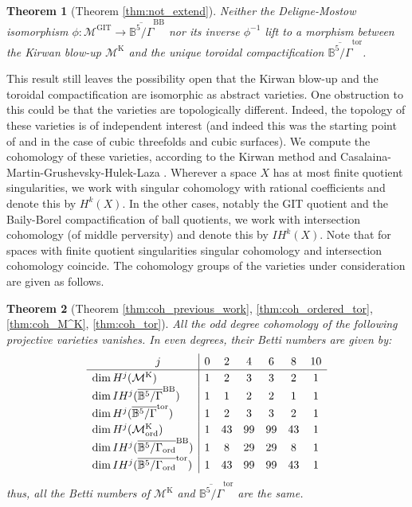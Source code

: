 \documentclass[12pt, pdftex]{amsart}
\theoremstyle{plain}
\newtheorem{thm}{Theorem}[section]
\theoremstyle{definition}
\numberwithin{equation}{section}
\def\B{{\mathbb B}}
\def\dim{\mathop{\mathrm{dim}}\nolimits}
\def\ord{\mathrm{ord}}
\def\GIT{\mathrm{GIT}}
\def\K{\mathrm{K}}
\def\tor{\mathrm{tor}}
\def\BB{\mathrm{BB}}
\def\M{\mathcal{M}}
\begin{document}
\begin{thm}[{Theorem \ref{thm:not_extend}}]
\label{mainthm:extendability}
Neither the Deligne-Mostow isomorphism $\phi:\M^{\GIT}\to\overline{\B^5/\Gamma}^{\BB}$ nor its inverse $\phi^{-1}$ lift to a morphism between the Kirwan blow-up $\M^{\K}$ and the unique toroidal compactification 
$\overline{\B^5/\Gamma}^{\tor}$.
\end{thm}



This result still leaves the possibility open that the Kirwan blow-up and the toroidal compactification are isomorphic as abstract varieties. 
One obstruction to this could be that the varieties are topologically different. Indeed, the topology of these varieties is of independent interest
(and indeed this was the starting point of \cite{CMGHL19} and  \cite{CMGHL22} in the case of cubic threefolds and cubic surfaces).
We compute the cohomology of these varieties, according to the Kirwan method \cite{Ki84, Ki85, Ki89} and Casalaina-Martin-Grushevsky-Hulek-Laza \cite{CMGHL19}.
Wherever a space $X$ has at most finite quotient singularities, we work with singular cohomology with rational coefficients and denote this by $H^k(X)$. In the other cases, notably the GIT quotient and 
the Baily-Borel compactification of ball quotients, we work with intersection cohomology (of middle perversity) and denote this by $IH^k(X)$. Note that for spaces with finite quotient singularities 
singular cohomology and intersection cohomology coincide.  
The cohomology groups of the varieties under consideration are given as follows.
\begin{thm}[{Theorem \ref{thm:coh_previous_work}, \ref{thm:coh_ordered_tor}, \ref{thm:coh_M^K}, \ref{thm:coh_tor}}]
All the odd degree cohomology of the following projective varieties vanishes.
In even degrees, their Betti numbers are given by:
\begin{align*}
\renewcommand*{\arraystretch}{1.2}
\begin{array}{l|cccccc}
\hskip2cm j&0&2&4&6&8&10\\\hline
\dim H^j(\M^{\K})&1&2&3&3&2&1\\
\dim IH^j(\overline{\B^5/\Gamma}^{\BB})&1&1&2&2&1&1\\
\dim H^j(\overline{\B^5/\Gamma}^{\tor})&1&2&3&3&2&1\\
\dim H^j(\M_{\ord}^{\K})&1&43&99&99&43&1\\
\dim IH^j(\overline{\B^5/\Gamma_{\ord}}^{\BB})&1&8&29&29&8&1\\
\dim IH^j(\overline{\B^5/\Gamma_{\ord}}^{\tor})&1&43&99&99&43&1
\end{array}
\end{align*}
thus, all the Betti numbers of $\M^{\K}$ and $\overline{\B^5/\Gamma}^{\tor}$ are the same.
\end{thm}
\end{document}
